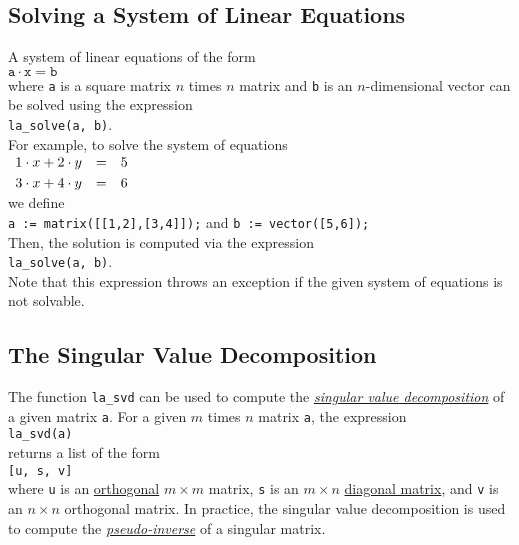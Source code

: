 \subsection{Solving a System of Linear Equations}
A system of linear equations of the form
\\[0.2cm]
\hspace*{1.3cm}
$\texttt{a} \cdot \texttt{x} = \texttt{b}$
\\[0.2cm]
where \texttt{a} is a square matrix $n$ times $n$  matrix and  \texttt{b} is an $n$-dimensional
vector can be solved using the expression
\\[0.2cm]
\hspace*{1.3cm}
\texttt{la\_solve(a, b)}.
\\[0.2cm]
For example, to solve the system of equations
\\[0.2cm]
\hspace*{1.3cm}
$
\begin{array}[c]{lcl}
  1 \cdot x + 2 \cdot y & = & 5 \\[0.1cm]
  3 \cdot x + 4 \cdot y & = & 6 
\end{array}
$
\\[0.2cm]
we define
\\[0.2cm]
\hspace*{1.3cm}
\texttt{a := matrix([[1,2],[3,4]]);} \quad and \quad \texttt{b := vector([5,6]);}
\\[0.2cm]
Then, the solution is computed via the expression
\\[0.2cm]
\hspace*{1.3cm}
\texttt{la\_solve(a, b)}.
\\[0.2cm]
Note that this expression throws an exception if the given system of equations is not solvable.

\subsection{The Singular Value Decomposition}
The function \texttt{la\_svd} can be used to compute the 
\href{http://en.wikipedia.org/wiki/Singular_value_decomposition}{\emph{singular value decomposition}} 
of a given matrix \texttt{a}.  For a given $m$ times $n$ matrix \texttt{a}, the expression 
\\[0.2cm]
\hspace*{1.3cm}
\texttt{la\_svd(a)}
\\[0.2cm]
returns a list of the form
\\[0.2cm]
\hspace*{1.3cm}
\texttt{[u, s, v]}
\\[0.2cm]
where \texttt{u} is an 
\href{http://en.wikipedia.org/wiki/Orthogonal_matrix}{orthogonal} $m \times m$ matrix, \texttt{s}
is an $m \times n$ 
\href{http://en.wikipedia.org/wiki/Diagonal_matrix}{diagonal matrix}, and \texttt{v} is an $n \times n$
orthogonal matrix.  In practice, the singular value decomposition is used to compute the
\href{http://en.wikipedia.org/wiki/Moore-Penrose_pseudoinverse}{\emph{pseudo-inverse}}
 of a singular matrix. 

